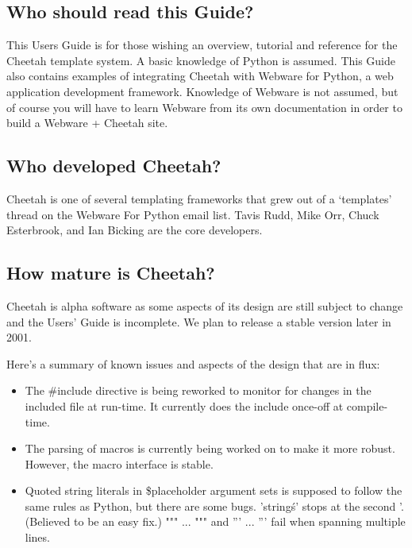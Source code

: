 \subsection{Who should read this Guide?}

This Users Guide is for those wishing an overview, tutorial and reference for
the Cheetah template system.  A basic knowledge of Python is assumed.
This Guide also contains examples of integrating Cheetah with Webware for
Python, a web application development framework.  Knowledge of Webware is not
assumed, but of course you will have to learn Webware from its own 
documentation in order to build a Webware + Cheetah site.

\subsection{Who developed Cheetah?}
\label{intro.developers}

Cheetah is one of several templating frameworks that grew out of a `templates'
thread on the Webware For Python email list.  Tavis Rudd, Mike Orr, Chuck
Esterbrook, and Ian Bicking are the core developers.

\subsection{How mature is Cheetah?}
\label{intro.mature}

Cheetah is alpha software as some aspects of its design are
still subject to change and the Users' Guide is incomplete.
We plan to release a stable version later in 2001.

Here's a summary of known issues and aspects of the design that are in flux:
\begin{itemize}

\item The \#include directive is being reworked to monitor for changes in the
     included file at run-time. It currently does the include once-off at
     compile-time.

\item The parsing of macros is currently being worked on to make it more
     robust.  However, the macro interface is stable.
     
\item Quoted string literals in \$placeholder argument sets is supposed to
     follow the same rules as Python, but there are some bugs.  'string\'s'
     stops at the second '.  (Believed to be an easy fix.)  """ ... """ and '''
     ... ''' fail when spanning multiple lines.

\end{itemize}

